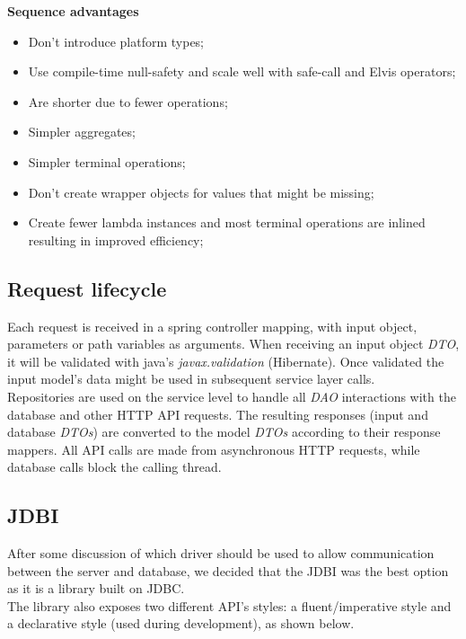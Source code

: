  \textbf{Sequence advantages}
 \begin{itemize}
     \item Don’t introduce platform types;
     \item Use compile-time null-safety and scale well with safe-call and Elvis operators;
     \item Are shorter due to fewer operations;
     \item Simpler aggregates;
     \item Simpler terminal operations;
     \item Don’t create wrapper objects for values that might be missing;
     \item Create fewer lambda instances and most terminal operations are inlined resulting in improved efficiency;
 \end{itemize}


\subsection{Request lifecycle}
Each request is received in a spring controller mapping, with input object,
parameters or path variables as arguments. When receiving an input object \textit{DTO},
it will be validated with java's \textit{javax.validation} (Hibernate).
Once validated the input model's data might be used in subsequent service layer calls.\\

Repositories are used on the service level to handle all \textit{DAO} interactions with
the database and other HTTP API requests. The resulting responses (input and database \textit{DTOs})
are converted to the model \textit{DTOs} according to their response mappers.
All API calls are made from asynchronous HTTP requests, while database calls block the calling thread.\\

\subsection{JDBI}

After some discussion of which driver should be used to allow communication between the server and database, we decided that the JDBI\cite{jdbi} was the best
option as it is a library built on JDBC\cite{jdbc}.\\

The library also exposes two different API's styles: a fluent/imperative style and a declarative style (used during development), as shown below.

